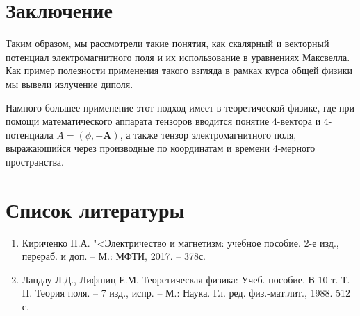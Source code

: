\documentclass[12pt]{kiarticle}
\begin{document}

\section{Заключение}

Таким образом, мы рассмотрели такие понятия, как скалярный и векторный потенциал электромагнитного поля и их использование в уравнениях Максвелла. Как пример полезности применения такого взгляда в рамках курса общей физики мы вывели излучение диполя.

Намного большее применение этот подход имеет в теоретической физике, где при помощи математического аппарата тензоров вводится понятие 4-вектора и 4-потенциала $ A = (\phi, -\mathbf{A}) $, а также тензор электромагнитного поля, выражающийся через производные по координатам и времени 4-мерного пространства. 

\section*{Список литературы}

\begin{enumerate}
	
	\item Кириченко Н.А. "<Электричество и магнетизм: учебное пособие. 2-е изд., перераб. и доп. -- М.: МФТИ, 2017. -- 378с.
	
	\item Ландау Л.Д., Лифшиц Е.М. Теоретическая физика: Учеб. пособие. В 10 т. Т. II. Теория поля. -- 7 изд., испр. -- М.: Наука. Гл. ред. физ.-мат.лит., 1988. 512 с.
	
\end{enumerate}
\end{document}
